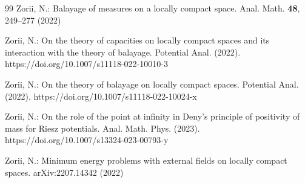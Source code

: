 \documentclass[12pt,a4paper,reqno]{amsart} %
\theoremstyle{lause}
\theoremstyle{maaritelma}
\theoremstyle{lause}
\theoremstyle{maaritelma}
\numberwithin{equation}{section}
\begin{document}
\begin{thebibliography}{99}
 Zorii, N.: Balayage of measures on a locally compact space.
Anal. Math. {\bf 48}, 249--277 (2022)

 Zorii, N.: On the theory of capacities on locally compact spaces and its interaction with the theory of balayage. Potential Anal. (2022). https://doi.org/10.1007/s11118-022-10010-3

 Zorii, N.: On the theory of balayage on locally compact spaces. Potential Anal. (2022). https://doi.org/10.1007/s11118-022-10024-x

 Zorii, N.: On the role of the point at infinity in Deny's principle of positivity of mass for Riesz potentials.  Anal. Math. Phys. (2023). https://doi.org/10.1007/s13324-023-00793-y

 Zorii, N.: Minimum energy problems with external fields on locally compact spaces. arXiv:2207.14342 (2022)
\end{thebibliography}
\end{document}
